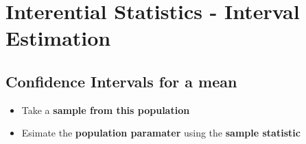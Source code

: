 \documentclass[a4paper, 10pt]{article}
\begin{document}
\pagebreak

\section{Interential Statistics - Interval Estimation}
\subsection{Confidence Intervals for a mean}
\begin{examplebox}
    \begin{itemize}
        \item Take a \textbf{sample from this population}
        \item Esimate the \textbf{population paramater} using the \textbf{sample statistic}
    \end{itemize}
\end{examplebox}
\end{document}

